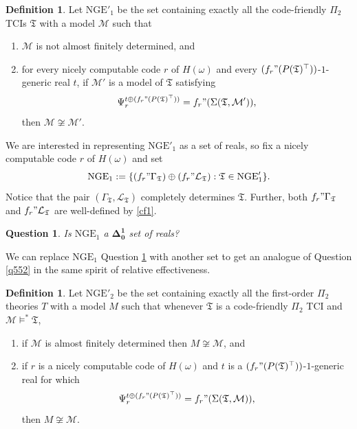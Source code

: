 \documentclass[12pt, twoside]{memoir}
\numberwithin{equation}{section}
\newtheorem{ques}[thm]{Question}
\theoremstyle{definition}
\newtheorem{defi}[thm]{Definition}
\theoremstyle{remark}
\theoremstyle{definition}
\theoremstyle{definition}
\theoremstyle{definition}
\theoremstyle{remark}
\begin{document}
\begin{defi}
Let $\mathrm{NGE}'_1$ be the set containing exactly all the code-friendly $\Pi_2$ TCIs $\mathfrak{T}$ with a model $\mathcal{M}$ such that
\begin{enumerate}[label=(\alph*)]
    \item $\mathcal{M}$ is not almost finitely determined, and
    \item for every nicely computable code $r$ of $H(\omega)$ and every $(f_r" (P(\mathfrak{T})^{\top}))$-$1$-generic real $t$, if $\mathcal{M}'$ is a model of $\mathfrak{T}$ satisfying 
    \begin{equation*}
        \Psi_r^{t \oplus (f_r" (P(\mathfrak{T})^{\top}))} = f_r" (\Sigma(\mathfrak{T}, \mathcal{M}')) \text{,}
    \end{equation*}
    then $\mathcal{M} \not \cong \mathcal{M}'$.
\end{enumerate}
\end{defi}

We are interested in representing $\mathrm{NGE}'_1$ as a set of reals, so fix a nicely computable code $r$ of $H(\omega)$ and set
\begin{equation*}
    \mathrm{NGE}_1 := \{(f_r" \Gamma_{\mathfrak{T}}) \oplus (f_r" \mathcal{L}_{\mathfrak{T}}) : \mathfrak{T} \in \mathrm{NGE}'_1\} \text{.}
\end{equation*}
Notice that the pair $(\Gamma_{\mathfrak{T}}, \mathcal{L}_{\mathfrak{T}})$ completely determines $\mathfrak{T}$. Further, both $f_r" \Gamma_{\mathfrak{T}}$ and $f_r" \mathcal{L}_{\mathfrak{T}}$ are well-defined by \ref{cf1}.

\begin{ques}\label{q553}
Is $\mathrm{NGE}_1$ a $\mathbf{\Delta^1_0}$ set of reals?
\end{ques}

We can replace $\mathrm{NGE}_1$ Question \ref{q553} with another set to get an analogue of Question \ref{q552} in the same spirit of relative effectiveness. 

\begin{defi}
Let $\mathrm{NGE}'_2$ be the set containing exactly all the first-order $\Pi_2$ theories $T$ with a model $M$ such that whenever $\mathfrak{T}$ is a code-friendly $\Pi_2$ TCI and $\mathcal{M} \models^* \mathfrak{T}$,
\begin{enumerate}[label=(\alph*)]
    \item if $\mathcal{M}$ is almost finitely determined then $M \not \cong \mathcal{M}$, and
    \item if $r$ is a nicely computable code of $H(\omega)$ and $t$ is a $(f_r" (P(\mathfrak{T})^{\top}))$-$1$-generic real for which
    \begin{equation*}
        \Psi_r^{t \oplus (f_r" (P(\mathfrak{T})^{\top}))} = f_r" (\Sigma(\mathfrak{T}, \mathcal{M})) \text{,}
    \end{equation*}
    then $M \not \cong \mathcal{M}$.
\end{enumerate}
\end{defi}
\end{document}
